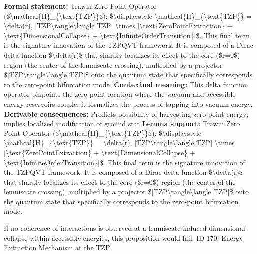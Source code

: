 \begingroup\footnotesize\setlength{\emergencystretch}{3em}\sloppy
\textbf{Formal statement:} Trawin Zero Point Operator (\$\textbackslash{}mathcal\{H\}\_\{\textbackslash{}text\{TZP\}\}\$): \$\textbackslash{}displaystyle \textbackslash{}mathcal\{H\}\_\{\textbackslash{}text\{TZP\}\} = \textbackslash{}delta(r), |TZP\textbackslash{}rangle\textbackslash{}langle TZP| \textbackslash{}times [\textbackslash{}text\{ZeroPointExtraction\} + \textbackslash{}text\{DimensionalCollapse\} + \textbackslash{}text\{InfiniteOrderTransition\}]\$. This final term is the signature innovation of the TZPQVT framework. It is composed of a Dirac delta function \$\textbackslash{}delta(r)\$ that sharply localizes its effect to the core (\$r=0\$) region (the center of the lemniscate crossing), multiplied by a projector \$|TZP\textbackslash{}rangle\textbackslash{}langle TZP|\$ onto the quantum state that specifically corresponds to the zero-point bifurcation mode.
\textbf{Contextual meaning:} This delta function operator pinpoints the zero point location where the vacuum and accessible energy reservoirs couple; it formalizes the process of tapping into vacuum energy.
\textbf{Derivable consequences:} Predicts possibility of harvesting zero point energy; implies localized modification of ground stat
\textbf{Lemma support:} Trawin Zero Point Operator (\$\textbackslash{}mathcal\{H\}\_\{\textbackslash{}text\{TZP\}\}\$): \$\textbackslash{}displaystyle \textbackslash{}mathcal\{H\}\_\{\textbackslash{}text\{TZP\}\} = \textbackslash{}delta(r), |TZP\textbackslash{}rangle\textbackslash{}langle TZP| \textbackslash{}times [\textbackslash{}text\{ZeroPointExtraction\} + \textbackslash{}text\{DimensionalCollapse\} + \textbackslash{}text\{InfiniteOrderTransition\}]\$. This final term is the signature innovation of the TZPQVT framework. It is composed of a Dirac delta function \$\textbackslash{}delta(r)\$ that sharply localizes its effect to the core (\$r=0\$) region (the center of the lemniscate crossing), multiplied by a projector \$|TZP\textbackslash{}rangle\textbackslash{}langle TZP|\$ onto the quantum state that specifically corresponds to the zero-point bifurcation mode.\par
\endgroup

If no coherence of interactions is observed at a lemniscate induced dimensional collapse within accessible energies, this proposition would fail. ID 170: Energy Extraction Mechanism at the TZP

